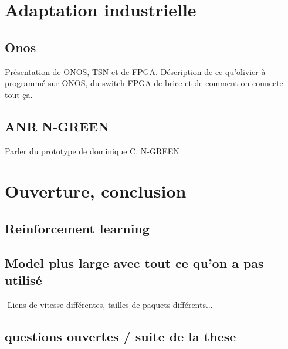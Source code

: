 \documentclass[a4paper,10pt]{article}
\begin{document}
\section{Adaptation industrielle}
\subsection{Onos}
Présentation de ONOS, TSN et de FPGA. Déscription de ce qu'olivier à programmé sur ONOS, du switch FPGA de brice et de comment on connecte tout ça. 
\subsection{ANR N-GREEN}
Parler du prototype de dominique C. N-GREEN
\section{Ouverture, conclusion}

\subsection{Reinforcement learning}
\subsection{Model plus large avec tout ce qu'on a pas utilisé}
-Liens de vitesse différentes, tailles de paquets différents...
\subsection{questions ouvertes / suite de la these}
\end{document}
